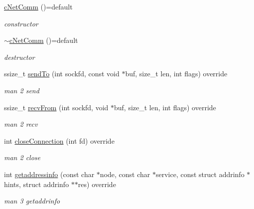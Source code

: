 \begin{DoxyCompactItemize}
\item 
\mbox{\label{classcFunctions_1_1cNetComm_a960a73814e546f66af314a28ab2ef2ed}} 
\mbox{\hyperlink{classcFunctions_1_1cNetComm_a960a73814e546f66af314a28ab2ef2ed}{c\+Net\+Comm}} ()=default
\begin{DoxyCompactList}\small\item\em constructor \end{DoxyCompactList}\item 
\mbox{\label{classcFunctions_1_1cNetComm_a865ea043762ab7146e262e9501be9dbe}} 
\mbox{\hyperlink{classcFunctions_1_1cNetComm_a865ea043762ab7146e262e9501be9dbe}{$\sim$c\+Net\+Comm}} ()=default
\begin{DoxyCompactList}\small\item\em destructor \end{DoxyCompactList}\item 
ssize\+\_\+t \mbox{\hyperlink{classcFunctions_1_1cNetComm_a774fa4628c85b0410a481ff0acc59272}{send\+To}} (int sockfd, const void $\ast$buf, size\+\_\+t len, int flags) override
\begin{DoxyCompactList}\small\item\em man 2 send \end{DoxyCompactList}\item 
ssize\+\_\+t \mbox{\hyperlink{classcFunctions_1_1cNetComm_a23c32fc6d414973d9c868f047db6d1f0}{recv\+From}} (int sockfd, void $\ast$buf, size\+\_\+t len, int flags) override
\begin{DoxyCompactList}\small\item\em man 2 recv \end{DoxyCompactList}\item 
int \mbox{\hyperlink{classcFunctions_1_1cNetComm_acca23e81b8cdf8d9a46b46564f76cf3a}{close\+Connection}} (int fd) override
\begin{DoxyCompactList}\small\item\em man 2 close \end{DoxyCompactList}\item 
int \mbox{\hyperlink{classcFunctions_1_1cNetComm_a131fdff9c6242f5b7df5dc82b1ece91c}{getaddressinfo}} (const char $\ast$node, const char $\ast$service, const struct addrinfo $\ast$hints, struct addrinfo $\ast$$\ast$res) override
\begin{DoxyCompactList}\small\item\em man 3 getaddrinfo \end{DoxyCompactList}\item 
$$
\end{DoxyCompactItemize}
